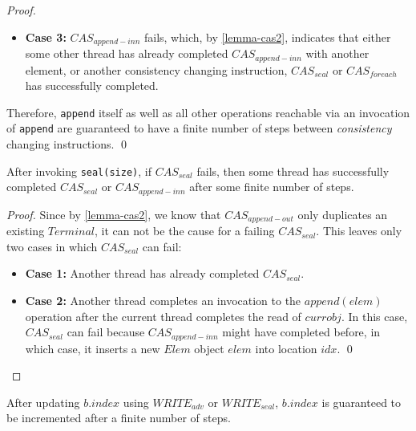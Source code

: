 \documentclass[runningheads,a4paper]{llncs}
\begin{document}
\begin{proof}
\begin{itemize}
\item \textbf{Case 3:} $CAS_{append-inn}$ fails, which, by 
\ref{lemma-cas2}, indicates that either some other thread has already completed 
$CAS_{append-inn}$ with another element, or another consistency changing
instruction, $CAS_{seal}$ or $CAS_{foreach}$ has successfully completed.

\end{itemize}

Therefore, \verb=append= itself as well as all other operations reachable via an
invocation of \verb=append= are guaranteed to have a finite number of steps between
\textit{consistency} changing instructions.
\qed
\end{proof}



\begin{lemma}\label{lemma-cas5}
After invoking \verb=seal(size)=, if $CAS_{seal}$ fails, then some thread has
successfully completed $CAS_{seal}$ or $CAS_{append-inn}$ after some finite number of steps.
\end{lemma}

\begin{proof} Since by \ref{lemma-cas2}, we know that $CAS_{append-out}$
only duplicates an existing $Terminal$, it can not be the cause for a failing
$CAS_{seal}$. This leaves only two cases in which $CAS_{seal}$ can fail:

\begin{itemize}
\item \textbf{Case 1:} Another thread has already completed $CAS_{seal}$.
\item \textbf{Case 2:} Another thread completes an invocation to the
$append(elem)$ operation after the current thread completes the read of
$currobj$. In this  case, $CAS_{seal}$ can fail because $CAS_{append-inn}$ 
might have  completed before, in which case, it inserts a new $Elem$ object 
$elem$  into location $idx$.
\qed
\end{itemize}
\end{proof}


\begin{lemma}\label{lemma-write2-write3}
After updating $b.index$ using $WRITE_{adv}$ or $WRITE_{seal}$,  $b.index$ is guaranteed
to be incremented after a finite number of steps.
\end{lemma}
\end{document}
